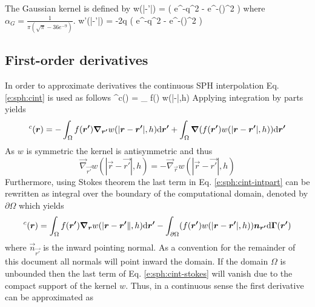 The Gaussian kernel is defined by
\be \label{e:sph:gaussian}
  w(|-'|) =  \left( e^{-q^2} - e^{-\left(\right)^2} \right)
\en
where $\alpha_{G} = \frac{1}{\pi \left( \sqrt{\pi}-36e^{-9}\right)}$.
\be \label{e:sph:gradgaussian}
  w'(|-'|) = -2q \left( e^{-q^2} - e^{-\left(\right)^2} \right)
\en


\subsection{First-order derivatives}

In order to approximate derivatives the continuous SPH interpolation Eq.
\eqref{e:sph:cint} is used as follows
^c() = \int_\Omega \vec{\nabla} f() w(|-|,h) \td {}
\label{e:sph:cint-gradf-start}
\en
Applying integration by parts yields
\begin{equation}
[\vec{\nabla} f]^c(\vec{r}) = - \int_\Omega f(\vec{r'}) \vec{\nabla}_{\vec{r'}} w(|\vec{r}-\vec{r'}|,h) \td \vec{r'} +
\int_\Omega \vec{\nabla} (f(\vec{r'}) w(|\vec{r}-\vec{r'}|,h)) \td \vec{r'}
\label{e:sph:cint-intpart}
\end{equation}
As $w$ is symmetric the kernel is antisymmetric and thus
\begin{equation}
\vec{\nabla}_{\vec{r'}} w(|\vec{r}-\vec{r'}|,h) = - \vec{\nabla}_{\vec{r}} w(|\vec{r}-\vec{r'}|,h)
\label{e:sph:kernel-asym} \end{equation}
Furthermore, using Stokes
theorem the last term in Eq. \eqref{e:sph:cint-intpart} can be rewritten
as integral over the boundary of the computational domain, denoted by
$\partial \Omega$ which yields
\begin{equation}
[\vec{\nabla} f]^c(\vec{r}) = \int_\Omega f(\vec{r'}) \vec{\nabla}_{\vec{r}} w(|\vec{r}-\vec{r'}\|,h) \td \vec{r'} -
\int_{\partial\Omega} (f(\vec{r'}) w(|\vec{r}-\vec{r'}|,h)) \vec{n}_{\vec{r'}} \td \vec{\Gamma}(\vec{r'})
\label{e:sph:cint-stokes}
\end{equation}
where $\vec{n}_{\vec{r'}}$ is the inward pointing normal. As a convention for
the remainder of this document all normals will point inward the domain.
If the domain $\Omega$ is unbounded then the last term of Eq.
\eqref{e:sph:cint-stokes} will vanish due to the compact support of the
kernel $w$. Thus, in a continuous sense the first derivative can be
approximated as
